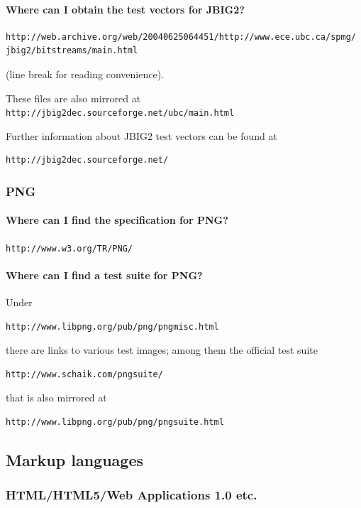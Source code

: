 \documentclass[10pt]{scrbook}
\begin{document}
\paragraph{Where can I obtain the test vectors for JBIG2?} \begin{verbatim}
http://web.archive.org/web/20040625064451/http://www.ece.ubc.ca/spmg/
jbig2/bitstreams/main.html
\end{verbatim} (line break for reading convenience).

These files are also mirrored at \verb|http://jbig2dec.sourceforge.net/ubc/main.html|

Further information about JBIG2 test vectors can be found at \begin{verbatim}
http://jbig2dec.sourceforge.net/
\end{verbatim}

\subsubsection{PNG}

\paragraph{Where can I find the specification for PNG?} \verb|http://www.w3.org/TR/PNG/|

\paragraph{Where can I find a test suite for PNG?}

Under \begin{verbatim}
http://www.libpng.org/pub/png/pngmisc.html
\end{verbatim}
there are links to various test images; among them the official test suite \begin{verbatim}
http://www.schaik.com/pngsuite/
\end{verbatim} that is also mirrored at \begin{verbatim}
http://www.libpng.org/pub/png/pngsuite.html
\end{verbatim}

\subsection{Markup languages}

\subsubsection{HTML/HTML5/Web Applications 1.0 etc.}
\end{document}
